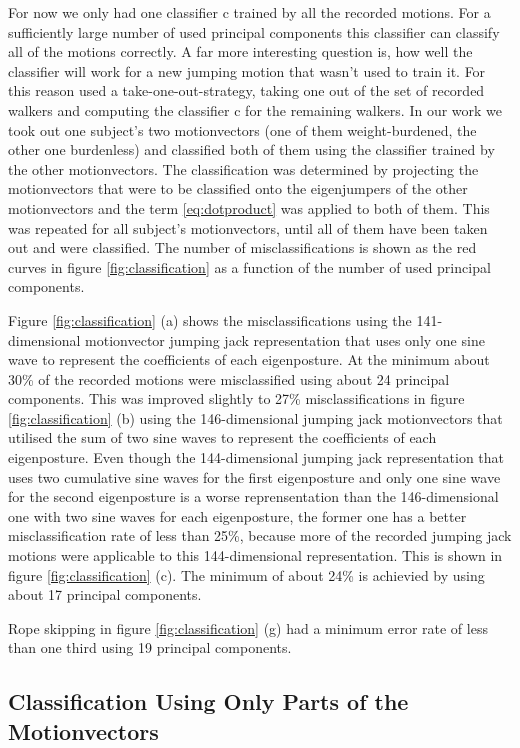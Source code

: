 \documentclass[a4paper]{article}
\begin{document}
For now we only had one classifier c trained by all the recorded motions.
For a sufficiently large number of used principal components this classifier can classify all of the motions correctly.
A far more interesting question is, how well the classifier will work for a new jumping motion that wasn't used to train it.
For this reason \cite{origin} used a take-one-out-strategy, taking one out of the set of recorded walkers and computing the classifier c for the remaining walkers. In our work we took out one subject's two motionvectors (one of them weight-burdened, the other one burdenless) and classified both of them using the classifier trained by the other motionvectors. The classification was determined by projecting the motionvectors that were to be classified onto the eigenjumpers of the other motionvectors and the term \ref{eq:dotproduct} was applied to both of them. This was repeated for all subject's motionvectors, until all of them have been taken out and were classified. The number of misclassifications is shown as the red curves in figure \ref{fig:classification} as a function of the number of used principal components.

Figure \ref{fig:classification} (a) shows the misclassifications using the 141-dimensional motionvector jumping jack representation that uses only one sine wave to represent the coefficients of each eigenposture. At the minimum about 30\% of the recorded motions were misclassified using about 24 principal components. This was improved slightly to 27\% misclassifications in figure \ref{fig:classification} (b) using the 146-dimensional jumping jack motionvectors that utilised the sum of two sine waves to represent the coefficients of each eigenposture. Even though the 144-dimensional jumping jack representation that uses two cumulative sine waves for the first eigenposture and only one sine wave for the second eigenposture is a worse reprensentation than the 146-dimensional one with two sine waves for each eigenposture, the former one has a better misclassification rate of less than 25\%, because more of the recorded jumping jack motions were applicable to this 144-dimensional representation. This is shown in figure \ref{fig:classification} (c). The minimum of about 24\% is achievied by using about 17 principal components.

Rope skipping in figure \ref{fig:classification} (g) had a minimum error rate of less than one third using 19 principal components.

\subsection{Classification Using Only Parts of the Motionvectors}
\end{document}
